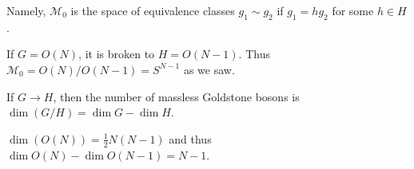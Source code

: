 Namely, $\mathcal{M}_0$ is the space of equivalence classes $g_1 \sim  g_2$ if $g_1 = h g_2 $ for some $h \in H$.

\begin{example}
    If $G = O\left( N \right) $, it is broken to  $H= O\left( N-1 \right) $. Thus $\mathcal{M}_0 = O\left( N \right) / O \left( N-1 \right) = S^{N-1}$ as we saw.
\end{example}

\begin{theorem}
    If $G \to H$, then the number of massless Goldstone bosons is $\dim \left( G / H \right) = \dim G - \dim H$.
\end{theorem}

\begin{example}
    $\dim \left( O\left( N \right)  \right) = \frac{1}{2} N \left( N -1 \right) $ and thus $\dim O\left( N \right) - \dim O\left( N-1 \right) = N - 1$.
\end{example}
 



